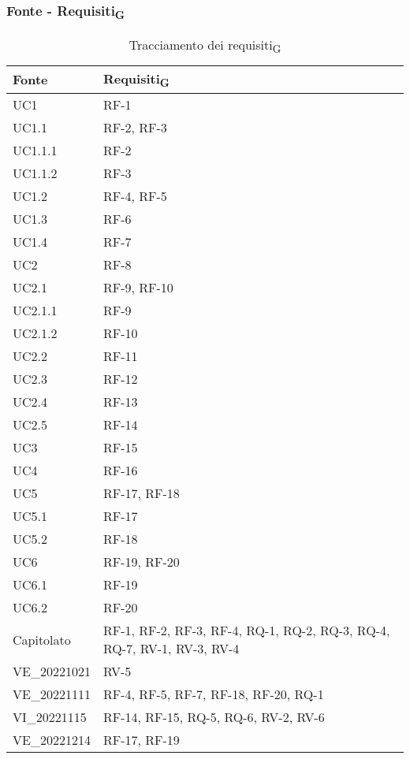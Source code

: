 \subsubsection{Fonte - Requisiti\textsubscript{G}}
\begin{table}[H]
	\centering
	\begin{tabular}{| p{} | p{} |} 
 \hline
 \textbf{Fonte} & \textbf{Requisiti\textsubscript{G}} \\
 \hline
	UC1 & RF-1\\
	\hline
	UC1.1 & RF-2, RF-3\\
    \hline
	UC1.1.1 & RF-2\\
    \hline
	UC1.1.2 & RF-3\\
	\hline
	UC1.2 & RF-4, RF-5\\
	\hline
	UC1.3 & RF-6\\
	\hline
	UC1.4 & RF-7\\
	\hline
	UC2 & RF-8\\
 	\hline
	UC2.1 & RF-9, RF-10\\
 \hline
	UC2.1.1 & RF-9\\
  \hline
	UC2.1.2 & RF-10\\
 	\hline
	UC2.2 & RF-11\\
  	\hline
	UC2.3 & RF-12\\
  	\hline
	UC2.4 & RF-13\\
  	\hline
	UC2.5 & RF-14\\
	\hline
	UC3 & RF-15\\ 
	\hline
	UC4 & RF-16\\
 	\hline
	UC5 & RF-17, RF-18\\
 \hline
	UC5.1 & RF-17\\
 \hline
	UC5.2 & RF-18\\
 	\hline
	UC6 & RF-19, RF-20\\
 \hline
	UC6.1 & RF-19\\
 \hline
	UC6.2 & RF-20\\
	\hline
	Capitolato & RF-1, RF-2, RF-3, RF-4, RQ-1, RQ-2, RQ-3, RQ-4, RQ-7, RV-1, RV-3, RV-4\\
 	\hline
	VE\_20221021 & RV-5\\
	\hline
	VE\_20221111 & RF-4, RF-5, RF-7, RF-18, RF-20, RQ-1\\
	\hline
	VI\_20221115 & RF-14, RF-15, RQ-5, RQ-6, RV-2, RV-6\\
 	\hline
	VE\_20221214 & RF-17, RF-19\\
	\hline
	\end{tabular}
	\caption{Tracciamento dei requisiti\textsubscript{G}}
\end{table}

